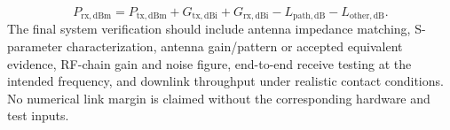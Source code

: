 \begin{equation}\label{eq:rf-link-budget}P_{\mathrm{rx,dBm}}=P_{\mathrm{tx,dBm}}+G_{\mathrm{tx,dBi}}+G_{\mathrm{rx,dBi}}-L_{\mathrm{path,dB}}-L_{\mathrm{other,dB}}.\end{equation}
The final system verification should include antenna impedance matching, S-parameter characterization, antenna gain/pattern or accepted equivalent evidence, RF-chain gain and noise figure, end-to-end receive testing at the intended frequency, and downlink throughput under realistic contact conditions. No numerical link margin is claimed without the corresponding hardware and test inputs.
